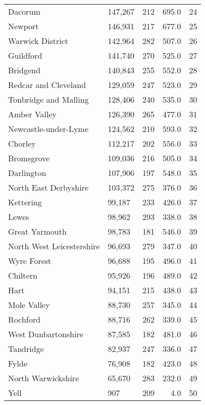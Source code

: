\begin{tabular}{llrrr}
Dacorum                   &    147,267 &   212 &    695.0 &    24 \\
Newport                   &    146,931 &   217 &    677.0 &    25 \\
Warwick District          &    142,964 &   282 &    507.0 &    26 \\
Guildford                 &    141,740 &   270 &    525.0 &    27 \\
Bridgend                  &    140,843 &   255 &    552.0 &    28 \\
Redcar and Cleveland      &    129,059 &   247 &    523.0 &    29 \\
Tonbridge and Malling     &    128,406 &   240 &    535.0 &    30 \\
Amber Valley              &    126,390 &   265 &    477.0 &    31 \\
Newcastle-under-Lyme      &    124,562 &   210 &    593.0 &    32 \\
Chorley                   &    112,217 &   202 &    556.0 &    33 \\
Bromsgrove                &    109,036 &   216 &    505.0 &    34 \\
Darlington                &    107,906 &   197 &    548.0 &    35 \\
North East Derbyshire     &    103,372 &   275 &    376.0 &    36 \\
Kettering                 &     99,187 &   233 &    426.0 &    37 \\
Lewes                     &     98,962 &   293 &    338.0 &    38 \\
Great Yarmouth            &     98,783 &   181 &    546.0 &    39 \\
North West Leicestershire &     96,693 &   279 &    347.0 &    40 \\
Wyre Forest               &     96,688 &   195 &    496.0 &    41 \\
Chiltern                  &     95,926 &   196 &    489.0 &    42 \\
Hart                      &     94,151 &   215 &    438.0 &    43 \\
Mole Valley               &     88,730 &   257 &    345.0 &    44 \\
Rochford                  &     88,716 &   262 &    339.0 &    45 \\
West Dunbartonshire       &     87,585 &   182 &    481.0 &    46 \\
Tandridge                 &     82,937 &   247 &    336.0 &    47 \\
Fylde                     &     76,908 &   182 &    423.0 &    48 \\
North Warwickshire        &     65,670 &   283 &    232.0 &    49 \\
Yell                      &        907 &   209 &      4.0 &    50 \\
\bottomrule
\end{tabular}
